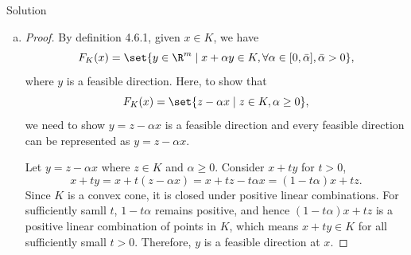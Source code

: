 \documentclass{article}
\theoremstyle{plain}
\theoremstyle{definition}
\theoremstyle{remark}
\begin{document}
\begin{solution}
    {Solution}
    \begin{enumerate}[(a)]
        \item {
            \begin{proof}
                By definition 4.6.1, given $x\in K$, we have \[F_K(x)=\set{y\in\R^m\mid x+\alpha y\in K, \forall \alpha\in[0,\bar{\alpha}], \bar{\alpha}>0},\] where $y$ is a feasible direction. Here, to show that \[F_K(x)=\set{z-\alpha x\mid z\in K, \alpha\geq 0},\] we need to show $y=z-\alpha x$ is a feasible direction and every feasible direction can be represented as $y=z-\alpha x$.

                Let $y=z-\alpha x$ where $z\in K$ and $\alpha\geq 0$. Consider $x+ty$ for $t>0$, \[x+ty=x+t(z-\alpha x)=x+tz-t\alpha x=(1-t\alpha)x+tz.\] Since $K$ is a convex cone, it is closed under positive linear combinations. For sufficiently samll $t$, $1-t\alpha$ remains positive, and hence $(1-t\alpha)x+tz$ is a positive linear combination of points in $K$, which means $x+ty\in K$ for all sufficiently small $t>0$. Therefore, $y$ is a feasible direction at $x$.


\end{proof}}
\end{enumerate}
\end{solution}
\end{document}
